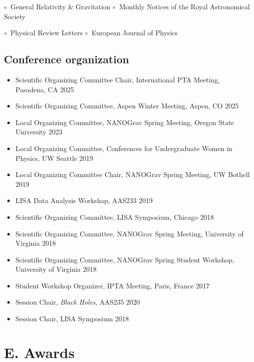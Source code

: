 \documentclass[11pt,letterpaper,sans,unicode]{moderncv}
\newcommand{\confitem}[2]{\item #1 \hfill #2} %
\newcommand{\blucirc}{{\color{color1} $\circ\;\;$}}
\begin{document}
\hspace{0.5mm} \blucirc General Relativity \& Gravitation  \hfill \blucirc Monthly Notices of the Royal Astronomical Society

\hspace{0.5mm} \blucirc Physical Review Letters  \hfill \blucirc European Journal of Physics


\subsection{Conference organization}
	\begin{itemize}[leftmargin=8mm]
	\confitem{Scientific Organizing Committee Chair, International PTA Meeting, Pasadena, CA}{2025}
	\confitem{Scientific Organizing Committee, Aspen Winter Meeting, Aspen, CO}{2025}
	\confitem{Local Organizing Committee, NANOGrav Spring Meeting, Oregon State University}{2023}
	\confitem{Local Organizing Committee, Conferences for Undergraduate Women in Physics, UW Seattle}{2019}
	\confitem{Local Organizing Committee Chair, NANOGrav Spring Meeting, UW Bothell}{2019}
	\confitem{LISA Data Analysis Workshop, AAS233}{2019}
	\confitem{Scientific Organizing Committee, LISA Symposium, Chicago}{2018}
	\confitem{Scientific Organizing Committee, NANOGrav Spring Meeting, University of Virginia}{2018}
	\confitem{Scientific Organizing Committee, NANOGrav Spring Student Workshop, University of Virginia}{2018}
    	\confitem{Student Workshop Organizer, IPTA Meeting, Paris, France}{2017}
	\confitem{Session Chair, \emph{Black Holes}, AAS235}{2020}
	\confitem{Session Chair, LISA Symposium}{2018}
	\end{itemize}



\section{E. Awards}

\end{document}
